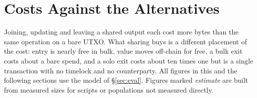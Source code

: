 \section{Costs Against the Alternatives}\label{sec:cost}

Joining, updating and leaving a shared output each cost more bytes than
the same operation on a bare UTXO. What sharing buys is a different
placement of the cost: entry is nearly free in bulk, value moves
off-chain for free, a bulk exit costs about a bare spend, and a solo exit
costs about ten times one but is a single transaction with no timelock and
no counterparty. All figures in this and the following sections use the
model of \S\ref{sec:eval}. Figures marked \emph{estimate} are built from
measured sizes for scripts or populations not measured directly.

